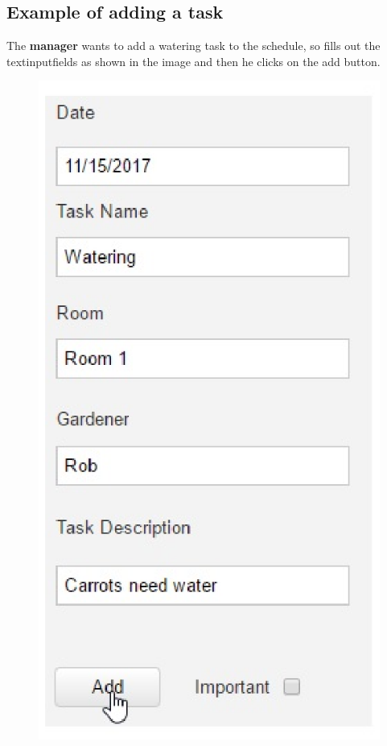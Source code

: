 \subsection{Example of adding a task}
The \textbf{manager} wants to add a watering task to the schedule, so fills out
the textinputfields as shown in the image and then he clicks on the add button.
\begin{figure}[h]
\includegraphics[width=1\textwidth]{images/addingTaskGardener.eps}
\end{figure}


